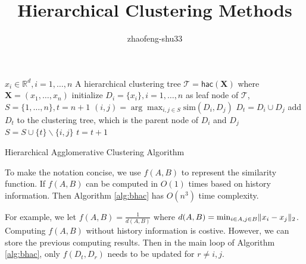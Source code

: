 \documentclass{article}
\title{Hierarchical Clustering Methods}
\author{zhaofeng-shu33}
\DeclarePairedDelimiter\abs{\lvert}{\rvert}
\DeclarePairedDelimiter\norm{\lVert}{\rVert}
\begin{document}
\maketitle
\begin{algorithm}\label{alg:bhac}
	\begin{algorithmic}[1]
		\REQUIRE $x_i \in \mathbb{R}^d, i=1,\dots, n$
		\ENSURE A hierarchical clustering tree $\mathcal{T} = \textsf{hac}(\mathbf{X})$ where $\mathbf{X}=(x_1,\dots, x_n)$
		\STATE initialize $D_i = \{x_i\}, i=1,\dots, n$ as leaf node of $\mathcal{T}$, $S=\{1, \dots, n\}, t=n+1$
		\STATE $(i,j) = \arg\max_{i,j \in S} \textrm{sim}(D_i, D_j)$
		\STATE $D_t = D_i \cup D_j$
		\STATE add $D_t$ to the clustering tree, which is the parent node of $D_i$ and $D_j$
		\STATE $S = S\cup \{t\}\backslash \{i, j\}$
		\STATE $t=t+1$
		\ENDWHILE
	\end{algorithmic}
\caption{Hierarchical Agglomerative Clustering Algorithm}
\end{algorithm}
To make the notation concise, we use $f(A,B)$ to represent the similarity function. If $f(A,B)$ can be computed in $O(1)$ times based on history information. Then Algorithm \ref{alg:bhac} has $O(n^3)$ time complexity.

For example, we let $f(A,B) = \frac{1}{d(A,B)}$ where $d(A,B)=\min_{i\in A, j\in B} \norm{x_i - x_j}_2$. Computing $f(A,B)$ without history information is costive. However, we can store the previous computing results. Then in the main loop of Algorithm \ref{alg:bhac}, only  $f(D_t, D_r)$ needs to be updated for $r\neq i,j$. 
\end{document}
